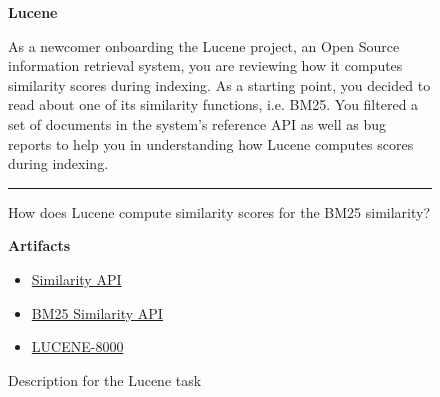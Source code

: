 \begin{figure}
\begin{mdframed}[backgroundcolor=gray!05] 
\begin{scriptsize}

{\large \textbf{Lucene}} \bigskip

As a newcomer onboarding the Lucene project, an Open Source information retrieval system,
you are reviewing how it computes similarity scores during indexing. As a starting point, you
decided to read about one of its similarity functions, i.e. BM25. You filtered a set of documents
in the system's reference API as well as bug reports to help you in understanding how Lucene
computes scores during indexing.

\begin{center}
\rule{10cm}{0.4pt}
\end{center}

How does Lucene compute similarity scores for the BM25 similarity?

\medskip

\textbf{Artifacts}

\begin{itemize}
    \item \href{https://lucene.apache.org/core/7_1_0/core/org/apache/lucene/search/similarities/Similarity.html}{Similarity API}
    \item \href{https://lucene.apache.org/core/7_1_0/core/org/apache/lucene/search/similarities/BM25Similarity.html}{BM25 Similarity API}
    \item \href{https://issues.apache.org/jira/si/jira.issueviews:issue-html/LUCENE-8000/LUCENE-8000.html}{LUCENE-8000}
\end{itemize}

\end{scriptsize}
\end{mdframed}
\caption{Description for the Lucene task}
\end{figure}

    
